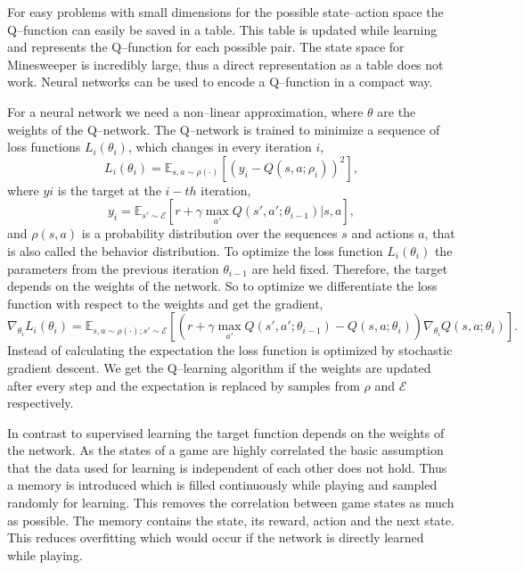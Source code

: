 For easy problems with small dimensions for the possible state--action space the Q--function can easily be saved in a table.
This table is updated while learning and represents the Q--function for each possible pair.
The state space for Minesweeper is incredibly large, thus a direct representation as a table does not work.
Neural networks can be used to encode a Q--function in a compact way.

For a neural network we need a non--linear approximation, where $\theta$ are the weights of the Q--network.
The Q--network is trained to minimize a sequence of loss functions $L_i\left(\theta_i\right)$, which changes in every iteration $i$,
\begin{equation}
L_i\left(\theta_i\right)= \mathbb{E}_{s,a \sim \rho \left( \cdot \right)}\left[ \left( y_i - Q\left(s,a;\rho_i \right) \right)^2\right],
\end{equation}
where $yi$ is the target at the $i-th$ iteration,
\begin{equation}
y_i = \mathbb{E}_{s'\sim \mathcal{E}}\left[ r+ \gamma \max_{a'} Q\left( s',a'; \theta_{i-1}\right)| s,a\right],
\end{equation}
and $\rho\left(s,a\right)$ is a probability distribution over the sequences $s$ and actions $a$, that is also called the behavior distribution.
To optimize the loss function $L_i\left(\theta_i\right)$ the parameters from the previous iteration $\theta_{i-1}$ are held fixed. 
Therefore, the target depends on the weights of the network. 
So to optimize we differentiate the loss function with respect to the weights and get the gradient,
\begin{equation}
\nabla_{\theta_i} L_i\left(\theta_i\right)= \mathbb{E}_{s,a\sim\rho\left(\cdot\right);s'\sim \mathcal{E}} \left[ \left( r + \gamma \max_{a'}Q\left(s',a';\theta_{i-1}\right) -Q\left(s,a;\theta_i\right) \right)\nabla_{\theta_i}Q\left(s,a;\theta_i\right)\right].
\end{equation}
Instead of calculating the expectation the loss function is optimized by stochastic gradient descent.
We get the Q--learning algorithm if the weights are updated after every step and the expectation is replaced by samples from $\rho$ and $\mathcal{E}$ respectively.

In contrast to supervised learning the target function depends on the weights of the network.
As the states of a game are highly correlated the basic assumption that the data used for learning is independent of each other does not hold.
Thus a memory is introduced which is filled continuously while playing and sampled randomly for learning.
This removes the correlation between game states as much as possible.
The memory contains the state, its reward, action and the next state.
This reduces overfitting which would occur if the network is directly learned while playing.

